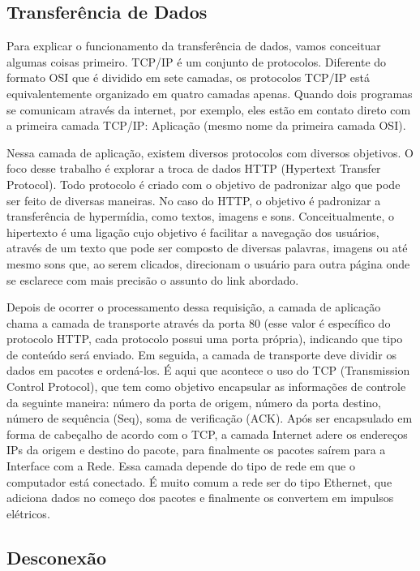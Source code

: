 \documentclass{article}
\begin{document}
\subsection{Transferência de Dados}

Para explicar o funcionamento da transferência de dados, vamos conceituar algumas coisas primeiro. TCP/IP é um conjunto de protocolos. Diferente do formato OSI que é dividido em sete camadas, os protocolos TCP/IP está equivalentemente organizado em quatro camadas apenas. Quando dois programas se comunicam através da internet, por exemplo, eles estão em contato direto com a primeira camada TCP/IP: Aplicação (mesmo nome da primeira camada OSI).

Nessa camada de aplicação, existem diversos protocolos com diversos objetivos. O foco desse trabalho é explorar a troca de dados HTTP (Hypertext Transfer Protocol). Todo protocolo é criado com o objetivo de padronizar algo que pode ser feito de diversas maneiras. No caso do HTTP, o objetivo é padronizar a transferência de hypermídia, como textos, imagens e sons. Conceitualmente, o hipertexto é uma ligação cujo objetivo é facilitar a navegação dos usuários, através de um texto que pode ser composto de diversas palavras, imagens ou até mesmo sons que, ao serem clicados, direcionam o usuário para outra página onde se esclarece com mais precisão o assunto do link abordado.

Depois de ocorrer o processamento dessa requisição, a camada de aplicação chama a camada de transporte através da porta 80 (esse valor é específico do protocolo HTTP, cada protocolo possui uma porta própria), indicando que tipo de conteúdo será enviado. Em seguida, a camada de transporte deve dividir os dados em pacotes e ordená-los. É aqui que acontece o uso do TCP (Transmission Control Protocol), que tem como objetivo encapsular as informações de controle da seguinte maneira: número da porta de origem, número da porta destino, número de sequência (Seq), soma de verificação (ACK). Após ser encapsulado em forma de cabeçalho de acordo com o TCP, a camada Internet adere os endereços IPs da origem e destino do pacote, para finalmente os pacotes saírem para a Interface com a Rede. Essa camada depende do tipo de rede em que o computador está conectado. É muito comum a rede ser do tipo Ethernet, que adiciona dados no começo dos pacotes e finalmente os convertem em impulsos elétricos.



\subsection{Desconexão}
\end{document}

